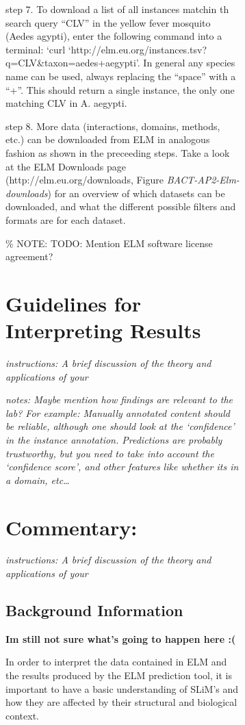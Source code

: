 {\begin{figure}[h!]
{{\begin{figure}[h!]
{{step 7. To download a list of all instances matchin th search query
``CLV'' in the yellow fever mosquito (Aedes agypti), enter the following
command into a terminal: `curl
`http://elm.eu.org/instances.tsv?q=CLV\&taxon=aedes+aegypti'. In general
any species name can be used, always replacing the ``space'' with a
``+''. This should return a single instance, the only one matching CLV
in A. aegypti.

step 8. More data (interactions, domains, methods, etc.) can be
downloaded from ELM in analogous fashion as shown in the preceeding
steps. Take a look at the ELM Downloads page
(http://elm.eu.org/downloads, Figure \emph{BACT-AP2-Elm-downloads}) for
an overview of which datasets can be downloaded, and what the different
possible filters and formats are for each dataset.

\% NOTE: TODO: Mention ELM software license agreement?

\section{Guidelines for Interpreting
Results}\label{guidelines-for-interpreting-results}

\emph{instructions: A brief discussion of the theory and applications of
your}

\emph{notes: Maybe mention how findings are relevant to the lab? For
example: Manually annotated content should be reliable, although one
should look at the `confidence' in the instance annotation. Predictions
are probably trustworthy, but you need to take into account the
`confidence score', and other features like whether its in a domain,
etc\ldots{}}

\section{Commentary:}\label{commentary}

\emph{instructions: A brief discussion of the theory and applications of
your}

\subsection{Background Information}\label{background-information}

\textbf{Im still not sure what's going to happen here :(}

In order to interpret the data contained in ELM and the results produced
by the ELM prediction tool, it is important to have a basic
understanding of SLiM's and how they are affected by their structural
and biological context.

}}
\end{figure}}}
\end{figure}}
